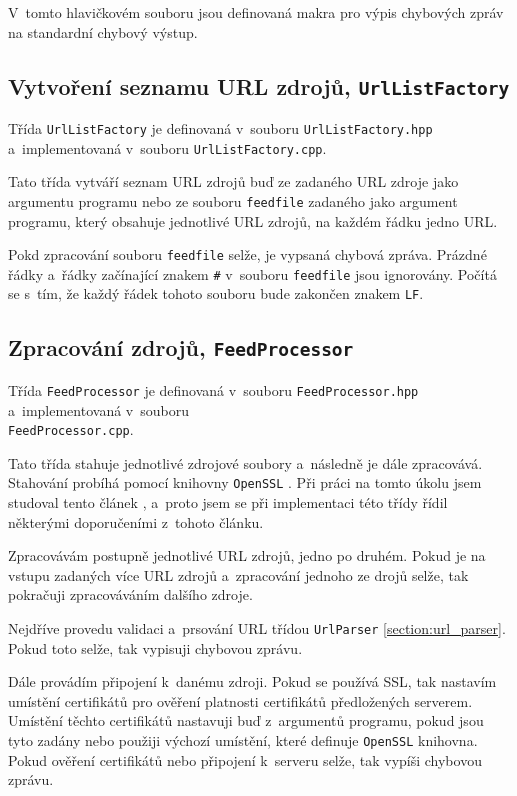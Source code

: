 \documentclass[a4paper, 11pt]{article}
\begin{document}
	V~tomto hlavičkovém souboru jsou definovaná makra pro výpis chybových
	zpráv na standardní chybový výstup.


	\subsection{Vytvoření seznamu URL zdrojů, \texttt{UrlListFactory}}
	\label{section:url_list_factory}

	Třída \texttt{UrlListFactory} je definovaná v~souboru
	\texttt{UrlListFactory.hpp} a~implementovaná v~souboru
	\texttt{UrlListFactory.cpp}.

	Tato třída vytváří seznam URL zdrojů buď ze zadaného URL zdroje jako
	argumentu programu nebo ze souboru \texttt{feedfile} zadaného jako
	argument programu, který obsahuje jednotlivé URL zdrojů, na každém
	řádku jedno URL.

	Pokd zpracování souboru \texttt{feedfile} selže, je vypsaná chybová
	zpráva. Prázdné řádky a~řádky začínající znakem \texttt{\#} v~souboru
	\texttt{feedfile} jsou ignorovány. Počítá se s~tím, že každý řádek
	tohoto souboru bude zakončen znakem \texttt{LF}.


	\subsection{Zpracování zdrojů, \texttt{FeedProcessor}}
	\label{section:feed_processor}

	Třída \texttt{FeedProcessor} je definovaná v~souboru
	\texttt{FeedProcessor.hpp} a~implementovaná v~souboru
	\\ \texttt{FeedProcessor.cpp}.

	Tato třída stahuje jednotlivé zdrojové soubory a~následně je dále
	zpracovává. Stahování probíhá pomocí knihovny \texttt{OpenSSL}
	\cite{openSSL}. Při práci na tomto úkolu jsem studoval tento článek
	\cite{openSSL_tutorial}, a~proto jsem se při implementaci této třídy řídil
	některými doporučeními z~tohoto článku.

	Zpracovávám postupně jednotlivé URL zdrojů, jedno po druhém. Pokud je na
	vstupu zadaných více URL zdrojů a~zpracování jednoho ze drojů selže, tak
	pokračuji zpracováváním dalšího zdroje.

	Nejdříve provedu validaci a~prsování URL třídou \texttt{UrlParser}
	\ref{section:url_parser}. Pokud toto selže, tak vypisuji chybovou
	zprávu.

	Dále provádím připojení k~danému zdroji. Pokud se používá SSL, tak
	nastavím umístění certifikátů pro ověření platnosti certifikátů
	předložených serverem. Umístění těchto certifikátů nastavuji buď
	z~argumentů programu, pokud jsou tyto zadány nebo použiji výchozí
	umístění, které definuje \texttt{OpenSSL} knihovna. Pokud ověření
	certifikátů nebo připojení k~serveru selže, tak vypíši chybovou zprávu.
\end{document}
